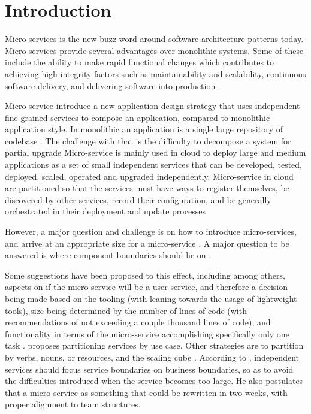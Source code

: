 \section{Introduction} \label{Introduction}
Micro-services is the new buzz word around software architecture patterns today. Micro-services provide several advantages over monolithic systems. Some of these include the ability to make rapid functional changes which contributes to achieving high integrity factors such as maintainability and scalability, continuous software delivery, and delivering software into production \cite{thones2015microservices}. 

Micro-service introduce a new application design strategy that uses independent fine grained services to compose an application, compared to monolithic application style. In monolithic an application is a single large repository of codebase \cite{Hasselbring2016}. The challenge with that is the difficulty to decompose a system for partial upgrade \cite{Le2014} Micro-service is mainly used in cloud to deploy large and medium applications as a set of small independent services that can be developed, tested, deployed, scaled, operated and upgraded independently. Micro-service in cloud are partitioned so that the services must have ways to register themselves, be discovered by other services, record their conﬁguration, and be generally orchestrated in their deployment and update processes\cite{Villamizar2016}  

 
\noindent
However, a major question and challenge is on how to introduce micro-services, and arrive at an appropriate size for a micro-service \cite{namiot2014micro,fowler2014microservices}. A major question to be answered is where component boundaries should lie on \cite{fowler2014microservices}.

\noindent
Some suggestions have been proposed to this effect, including among others, aspects on if the micro-service will be a user service, and therefore a decision being made based on the tooling (with leaning towards the usage of lightweight tools), size being determined by the number of lines of code (with recommendations of not exceeding a couple thousand lines of code), and functionality in terms of the micro-service accomplishing specifically only one task \cite{thones2015microservices}. \cite{namiot2014micro} proposes partitioning services by use case. Other strategies are to partition by verbs, nouns, or resources, and the scaling cube \cite{abbott2009art}. According to \cite{newman2015building}, independent services should focus service boundaries on	business	boundaries, so as to avoid the difficulties introduced when the service becomes too large. He also postulates that a micro service as something	that	could	be rewritten	in	two	weeks, with proper alignment to team structures.

